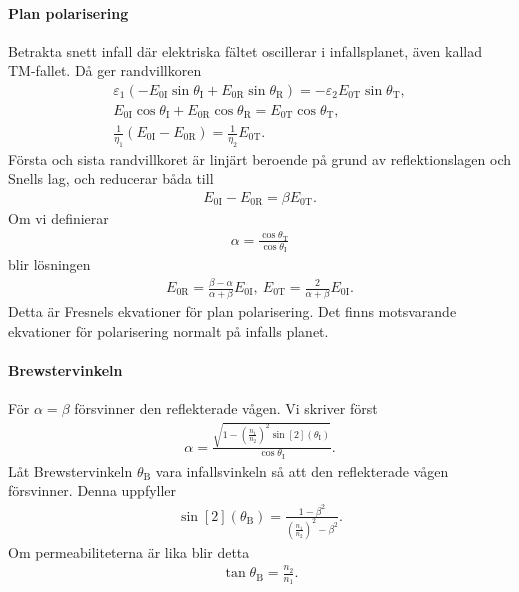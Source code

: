 \paragraph{Plan polarisering}
Betrakta snett infall där elektriska fältet oscillerar i infallsplanet, även kallad TM-fallet. Då ger randvillkoren
\begin{align*}
	\varepsilon_{1}(-E_{0\text{I}}\sin{\theta_{\text{I}}} + E_{0\text{R}}\sin{\theta_{\text{R}}}) = -\varepsilon_{2}E_{0\text{T}}\sin{\theta_{\text{T}}}, \\
	E_{0\text{I}}\cos{\theta_{\text{I}}} + E_{0\text{R}}\cos{\theta_{\text{R}}} = E_{0\text{T}}\cos{\theta_{\text{T}}}, \\
	\frac{1}{\eta_{1}}(E_{0\text{I}} - E_{0\text{R}}) = \frac{1}{\eta_{2}}E_{0\text{T}}.
\end{align*}
Första och sista randvillkoret är linjärt beroende på grund av reflektionslagen och Snells lag, och reducerar båda till
\begin{align*}
	E_{0\text{I}} - E_{0\text{R}} = \beta E_{0\text{T}}.
\end{align*}
Om vi definierar
\begin{align*}
	\alpha = \frac{\cos{\theta_{\text{T}}}}{\cos{\theta_{\text{I}}}}
\end{align*}
blir lösningen
\begin{align*}
	E_{0\text{R}} = \frac{\beta - \alpha}{\alpha + \beta}E_{0\text{I}},\ E_{0\text{T}} = \frac{2}{\alpha + \beta}E_{0\text{I}}.
\end{align*}
Detta är Fresnels ekvationer för plan polarisering. Det finns motsvarande ekvationer för polarisering normalt på infalls planet.

\paragraph{Brewstervinkeln}
För $\alpha = \beta$ försvinner den reflekterade vågen. Vi skriver först
\begin{align*}
	\alpha = \frac{\sqrt{1 - \left(\frac{n_{1}}{n_{2}}\right)^{2}\sin[2](\theta_{\text{I}})}}{\cos{\theta_{\text{I}}}}.
\end{align*}
Låt Brewstervinkeln $\theta_{\text{B}}$ vara infallsvinkeln så att den reflekterade vågen försvinner. Denna uppfyller
\begin{align*}
	\sin[2](\theta_{\text{B}}) = \frac{1 - \beta^{2}}{\left(\frac{n_{1}}{n_{2}}\right)^{2} - \beta^{2}}.
\end{align*}
Om permeabiliteterna är lika blir detta
\begin{align*}
	\tan{\theta_{\text{B}}} = \frac{n_{2}}{n_{1}}.
\end{align*}


